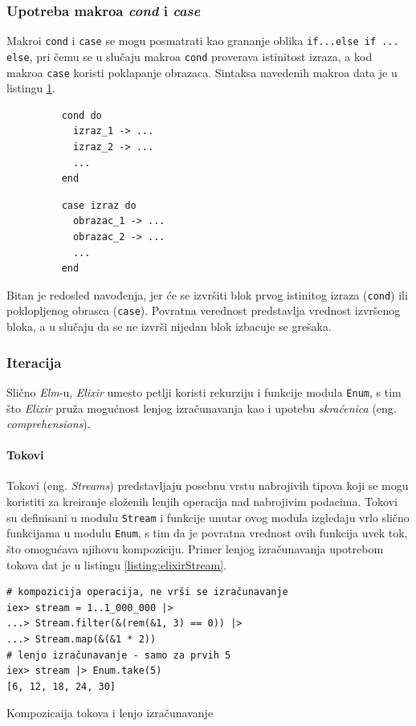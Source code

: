\documentclass[12pt,oneside]{memoir}
\begin{document}
\subsubsection{Upotreba makroa \emph{cond} i \emph{case}}
Makroi \texttt{cond} i \texttt{case} se mogu posmatrati kao grananje oblika \texttt{if...else
if ... else}, pri čemu se u slučaju makroa \texttt{cond} proverava istinitost izraza, a kod
makroa \texttt{case} koristi poklapanje obrazaca. Sintaksa navedenih makroa data je u
listingu \ref{listing:elixirCond}.
\begin{figure}[!h]
\begin{minipage}{0.5\textwidth}
  \centering
  \begin{verbatim}
    cond do
      izraz_1 -> ...
      izraz_2 -> ...
      ...
    end
  \end{verbatim}
\end{minipage}
\begin{minipage}{0.5\textwidth}
  \centering
  \begin{verbatim}
    case izraz do
      obrazac_1 -> ...
      obrazac_2 -> ...
      ...
    end
  \end{verbatim}
\end{minipage}
\label{listing:elixirCond}
\end{figure}

Bitan je redosled navođenja, jer će se izvršiti blok prvog istinitog izraza (\texttt{cond}) ili
poklopljenog obrasca (\texttt{case}). Povratna verednost predstavlja vrednost izvršenog bloka, a
u slučaju da se ne izvrši nijedan blok izbacuje se grešaka. 

\subsubsection{Iteracija}
Slično \emph{Elm}-u, \emph{Elixir} umesto petlji koristi rekurziju i funkcije modula \texttt{Enum}, s tim
što \emph{Elixir} pruža mogućnost lenjog izračunavanja kao i upotebu \emph{skraćenica}
(eng. \emph{comprehensions}).

\paragraph{Tokovi}
Tokovi (eng. \emph{Streams}) predstavljaju posebnu vrstu nabrojivih tipova koji se mogu koristiti za kreiranje
složenih lenjih operacija nad nabrojivim podacima. Tokovi su definisani u modulu
\texttt{Stream} i funkcije unutar ovog modula izgledaju vrlo slično funkcijama u modulu
\texttt{Enum}, s tim da je povratna vrednost ovih funkcija uvek tok, što omogućava
njihovu kompoziciju. Primer lenjog izračunavanja upotrebom tokova dat je u listingu
\ref{listing:elixirStream}. 
\begin{listing}[!ht]
\begin{verbatim}
# kompozicija operacija, ne vrši se izračunavanje
iex> stream = 1..1_000_000 |> 
...> Stream.filter(&(rem(&1, 3) == 0)) |> 
...> Stream.map(&(&1 * 2))
# lenjo izračunavanje - samo za prvih 5
iex> stream |> Enum.take(5) 
[6, 12, 18, 24, 30]
\end{verbatim}
\caption{Kompozicaija tokova i lenjo izračunavanje}
\label{listing:elixirStream}
\end{listing}
\end{document}
